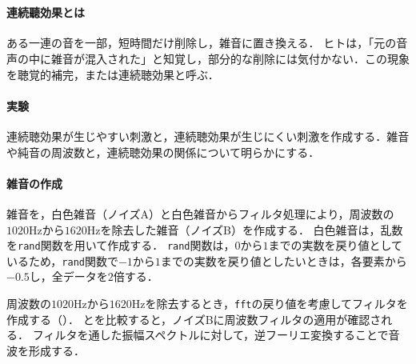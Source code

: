 \section{\kadaidb}\label{sec:\kadaidb}
\purpose
\paragraph{連続聽効果とは}
ある一連の音を一部，短時間だけ削除し，雑音に置き換える．
ヒトは，「元の音声の中に雑音が混入された」と知覚し，部分的な削除には気付かない．この現象を聴覚的補完，または連続聴効果と呼ぶ\cite[p.182\ -\ p.183]{感覚知覚心理学}．
\paragraph{実験}
連続聴効果が生じやすい刺激と，連続聴効果が生じにくい刺激を作成する．雑音や純音の周波数と，連続聴効果の関係について明らかにする．
\method
\paragraph{雑音の作成}
雑音を，白色雑音（ノイズA）と白色雑音からフィルタ処理により，周波数の\(1020\textrm{Hz}\)から\(1620\textrm{Hz}\)を除去した雑音（ノイズB）を作成する．
白色雑音は，乱数を\texttt{rand}関数を用いて作成する．
\texttt{rand}関数は，\(0\)から\(1\)までの実数を戻り値としているため，\texttt{rand}関数で\(-1\)から\(1\)までの実数を戻り値としたいときは，各要素から\(-0.5\)し，全データを\(2\)倍する．\par
周波数の\(1020\textrm{Hz}\)から\(1620\textrm{Hz}\)を除去するとき，\texttt{fft}の戻り値を考慮してフィルタを作成する（）．
とを比較すると，ノイズBに周波数フィルタの適用が確認される．
フィルタを通した振幅スペクトルに対して，逆フーリエ変換することで音波を形成する．\par
